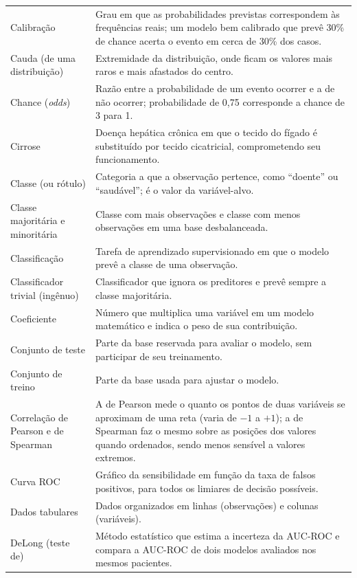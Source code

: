 \begin{longtable}{@{}p{3.8cm}p{10.7cm}@{}}
Calibração & Grau em que as probabilidades previstas correspondem às frequências reais; um modelo bem calibrado que prevê 30\% de chance acerta o evento em cerca de 30\% dos casos. \\[0.15cm]
Cauda (de uma distribuição) & Extremidade da distribuição, onde ficam os valores mais raros e mais afastados do centro. \\[0.15cm]
Chance (\textit{odds}) & Razão entre a probabilidade de um evento ocorrer e a de não ocorrer; probabilidade de 0,75 corresponde a chance de 3 para 1. \\[0.15cm]
Cirrose & Doença hepática crônica em que o tecido do fígado é substituído por tecido cicatricial, comprometendo seu funcionamento. \\[0.15cm]
Classe (ou rótulo) & Categoria a que a observação pertence, como ``doente'' ou ``saudável''; é o valor da variável-alvo. \\[0.15cm]
Classe majoritária e minoritária & Classe com mais observações e classe com menos observações em uma base desbalanceada. \\[0.15cm]
Classificação & Tarefa de aprendizado supervisionado em que o modelo prevê a classe de uma observação. \\[0.15cm]
Classificador trivial (ingênuo) & Classificador que ignora os preditores e prevê sempre a classe majoritária. \\[0.15cm]
Coeficiente & Número que multiplica uma variável em um modelo matemático e indica o peso de sua contribuição. \\[0.15cm]
Conjunto de teste & Parte da base reservada para avaliar o modelo, sem participar de seu treinamento. \\[0.15cm]
Conjunto de treino & Parte da base usada para ajustar o modelo. \\[0.15cm]
Correlação de Pearson e de Spearman & A de Pearson mede o quanto os pontos de duas variáveis se aproximam de uma reta (varia de $-1$ a $+1$); a de Spearman faz o mesmo sobre as posições dos valores quando ordenados, sendo menos sensível a valores extremos. \\[0.15cm]
Curva ROC & Gráfico da sensibilidade em função da taxa de falsos positivos, para todos os limiares de decisão possíveis. \\[0.15cm]
Dados tabulares & Dados organizados em linhas (observações) e colunas (variáveis). \\[0.15cm]
DeLong (teste de) & Método estatístico que estima a incerteza da AUC-ROC e compara a AUC-ROC de dois modelos avaliados nos mesmos pacientes. \\[0.15cm]

\end{longtable}
